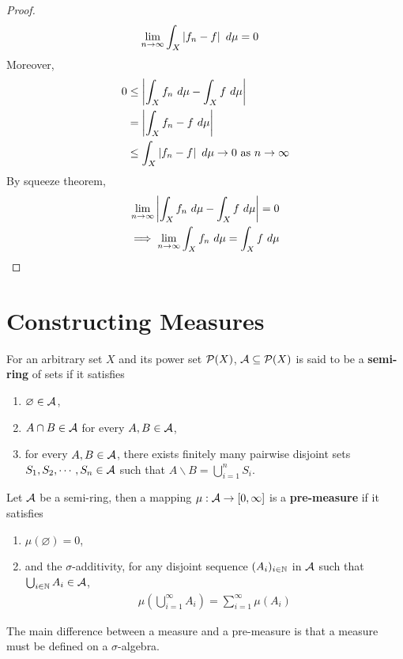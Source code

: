 \documentclass[11pt]{article}
\newcommand{\s}[0]{$\sigma$}
\begin{document}
\begin{proof}
	    \begin{align}
	        \lim_{n \to \infty}\int_X \left \vert {f_n - f} \right \vert\ d\mu &= 0 \label{eq:3}
	    \end{align}
	    Moreover,
	    \begin{align}
	        0 &\leq \left \vert {\int_X f_n\ d\mu - \int_X f\ d\mu} \right \vert \\
	        &= \left \vert {\int_X f_n - f\ d\mu} \right \vert \\
	        &\leq \int_X \left \vert {f_n - f} \right \vert\ d\mu \to 0 \text{{ as }} n \to \infty
	    \end{align}
	    By squeeze theorem,
	    \begin{align}
	        \lim_{n \to \infty} \abs{\int_X f_n\ d\mu - \int_X f\ d\mu} = 0 \\
	        \implies \lim_{n \to \infty} \int_X f_n\ d\mu = \int_X f\ d\mu
	    \end{align}
	\end{proof}
	
	\section{Constructing Measures}
	
	\begin{definition}
	    For an arbitrary set $X$ and its power set $\mathcal{{P}}(X)$, $\mathcal{{A}} \subseteq \mathcal{{P}}(X)$ is said to be a \textbf{semi-ring} of sets if it satisfies
	    \begin{enumerate}
	        \item $\varnothing \in \mathcal{{A}}$,
	        \item $A \cap B \in \mathcal{{A}}$ for every $A, B \in \mathcal{{A}}$,
	        \item for every $A, B \in \mathcal{{A}}$, there exists finitely many pairwise disjoint sets $S_1, S_2, \cdots, S_n \in \mathcal{{A}}$ such that $A \backslash B = \bigcup_{i=1}^n S_i$.
	    \end{enumerate}
	\end{definition}
	
	\begin{definition}
	    Let $\mathcal{{A}}$ be a semi-ring, then a mapping $\mu: \mathcal{{A}} \to [0, \infty]$ is a \textbf{pre-measure} if it satisfies
	    \begin{enumerate}
	        \item $\mu(\varnothing) = 0$,
	        \item and the \s-additivity, for any disjoint sequence $(A_i)_{i \in \mathbb{N}}$ in $\mathcal{{A}}$ such that $\bigcup_{i \in \mathbb{N}} A_i \in \mathcal{{A}}$,
	        \begin{align}
	            \mu\left(\bigcup_{i=1}^\infty A_i\right) = \sum_{i=1}^\infty \mu(A_i)
	        \end{align}
	    \end{enumerate}
	    The main difference between a measure and a pre-measure is that a measure must be defined on a \s-algebra.
	\end{definition}
	
\end{document}
